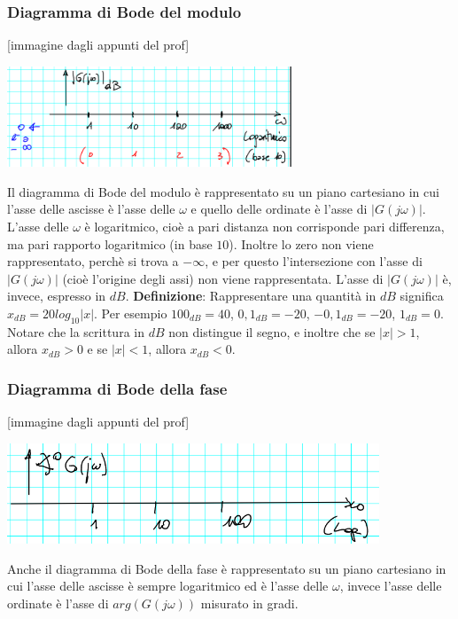 \subsubsection{Diagramma di Bode del modulo}
[immagine dagli appunti del prof]
\begin{center}
    \includegraphics[height=3cm]{../lezione12/img2.PNG}
\end{center}
Il diagramma di Bode del modulo è rappresentato su un piano cartesiano in cui l'asse delle ascisse è l'asse delle $\omega$ e quello delle ordinate è l'asse di $|G(j \omega)|$.\newline
\newline
L'asse delle $\omega$ è logaritmico, cioè a pari distanza non corrisponde pari differenza, ma pari rapporto logaritmico (in base $10$). Inoltre lo zero non viene rappresentato, perchè si trova a $- \infty$, e per questo l'intersezione con l'asse di $|G(j \omega)|$ (cioè l'origine degli assi) non viene rappresentata.\newline
\newline
L'asse di $|G(j \omega)|$ è, invece, espresso in $dB$.\newline
\newline
\textbf{Definizione}: Rappresentare una quantità in $dB$ significa $x_{dB} = 20 log_{10}|x|$.\newline
Per esempio $100_{dB} = 40$, $0,1 _{dB} = -20$, $-0,1 _{dB} = -20$, $1 _{dB} = 0$. Notare che la scrittura in $dB$ non distingue il segno, e inoltre che se $|x| > 1$, allora $x _{dB} >0$ e se $|x|<1$, allora $x _{dB} <0$.
\subsubsection{Diagramma di Bode della fase}
[immagine dagli appunti del prof]
\begin{center}
    \includegraphics[height=3cm]{../lezione12/img3.PNG}
\end{center}
Anche il diagramma di Bode della fase è rappresentato su un piano cartesiano in cui l'asse delle ascisse è sempre logaritmico ed è l'asse delle $\omega$, invece l'asse delle ordinate è l'asse di $arg(G(j \omega))$ misurato in gradi.
